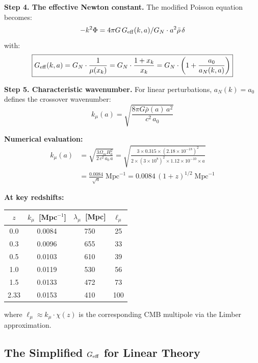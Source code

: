 \documentclass[11pt,a4paper]{article}
\newcommand{\ee}[1]{\times 10^{#1}}
\newcommand{\kmu}{k_\mu}
\newcommand{\Geff}{G_{\rm eff}}
\begin{document}
\begin{tcolorbox}[colback=blue!3!white, colframe=blue!60!black,
  title=\textbf{Finding \thesection: The Exact Scale-Dependent
  Modification}\label{find:perturbations}]
\textbf{Step 4. The effective Newton constant.} The modified Poisson
equation becomes:
\begin{equation}
-k^2\Phi = 4\pi G\,\Geff(k,a)/G_N \cdot a^2\bar{\rho}\,\delta
\end{equation}
with:
\begin{equation}
\boxed{
\Geff(k,a) = G_N \cdot \frac{1}{\mu(x_k)}
= G_N \cdot \frac{1 + x_k}{x_k}
= G_N \cdot \left(1 + \frac{a_0}{a_N(k,a)}\right)
}
\label{eq:Geff_exact}
\end{equation}

\textbf{Step 5. Characteristic wavenumber.} For linear perturbations,
$a_N(k) = a_0$ defines the crossover wavenumber:
\begin{equation}
\boxed{
\kmu(a) = \sqrt{\frac{8\pi G \bar{\rho}(a)\,a^2}{c^2\,a_0}}
}
\label{eq:kmu}
\end{equation}

\textbf{Numerical evaluation:}
\begin{align}
\kmu(a) &= \sqrt{\frac{3\Omega_m H_0^2}{2\,c^2\,a_0\,a}}
= \sqrt{\frac{3 \times 0.315 \times (2.18\ee{-18})^2}
{2 \times (3\ee{8})^2 \times 1.12\ee{-10} \times a}} \nonumber\\
&= \frac{0.0084}{\sqrt{a}}\;\text{Mpc}^{-1}
= 0.0084\,(1+z)^{1/2}\;\text{Mpc}^{-1}
\label{eq:kmu_numerical}
\end{align}

\textbf{At key redshifts:}
\begin{center}
\begin{tabular}{cccc}
\toprule
$z$ & $\kmu$~[Mpc$^{-1}$] & $\lambda_\mu$~[Mpc] & $\ell_\mu$ \\
\midrule
0.0 & 0.0084 & 750 & 25 \\
0.3 & 0.0096 & 655 & 33 \\
0.5 & 0.0103 & 610 & 39 \\
1.0 & 0.0119 & 530 & 56 \\
1.5 & 0.0133 & 472 & 73 \\
2.33 & 0.0153 & 410 & 100 \\
\bottomrule
\end{tabular}
\end{center}

where $\ell_\mu \approx k_\mu \cdot \chi(z)$ is the corresponding
CMB multipole via the Limber approximation.

\end{tcolorbox}

\subsection{The Simplified $\Geff$ for Linear Theory}
\end{document}
